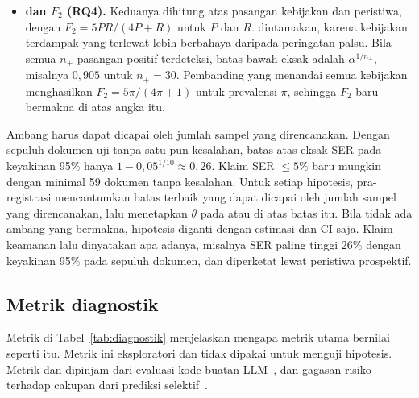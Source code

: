 \begin{itemize}[leftmargin=*,nosep]
  \item \textbf{ dan $F_2$ (RQ4).} Keduanya dihitung atas pasangan kebijakan dan peristiwa, dengan $F_2 = 5PR/(4P+R)$ untuk  $P$ dan  $R$.  diutamakan, karena kebijakan terdampak yang terlewat lebih berbahaya daripada peringatan palsu. Bila semua $n_+$ pasangan positif terdeteksi, batas bawah eksak  adalah $\alpha^{1/n_+}$, misalnya $0{,}905$ untuk $n_+ = 30$. Pembanding yang menandai semua kebijakan menghasilkan $F_2 = 5\pi/(4\pi+1)$ untuk prevalensi $\pi$, sehingga $F_2$ baru bermakna di atas angka itu.
\end{itemize}

Ambang harus dapat dicapai oleh jumlah sampel yang direncanakan. Dengan sepuluh dokumen uji tanpa satu pun kesalahan, batas atas eksak SER pada keyakinan 95\% hanya $1-0{,}05^{1/10} \approx 0{,}26$. Klaim SER $\leq 5\%$ baru mungkin dengan minimal 59 dokumen tanpa kesalahan. Untuk setiap hipotesis, pra-registrasi mencantumkan batas terbaik yang dapat dicapai oleh jumlah sampel yang direncanakan, lalu menetapkan $\theta$ pada atau di atas batas itu. Bila tidak ada ambang yang bermakna, hipotesis diganti dengan estimasi dan CI saja. Klaim keamanan lalu dinyatakan apa adanya, misalnya SER paling tinggi 26\% dengan keyakinan 95\% pada sepuluh dokumen, dan diperketat lewat peristiwa prospektif.


\subsection{Metrik diagnostik}
\label{subsec:diagnostik}

Metrik di Tabel~\ref{tab:diagnostik} menjelaskan mengapa metrik utama bernilai seperti itu. Metrik ini eksploratori dan tidak dipakai untuk menguji hipotesis. Metrik  dan  dipinjam dari evaluasi kode buatan LLM~\cite{li2022alphacode}, dan gagasan risiko terhadap cakupan dari prediksi selektif~\cite{varshney2022selective}.

